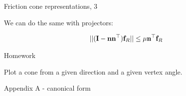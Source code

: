 \documentclass{beamer}
\begin{document}
\begin{frame}{Friction cone representations, 3}
	\begin{flushleft}
		
		We can do the same with projectors:
		
		
		\begin{equation}
			|| (\mathbf{I} - \mathbf{n}\mathbf{n}^\top) \mathbf{f}_R ||
			\leq \mu \mathbf{n}^\top \mathbf{f}_R
		\end{equation}
		
		
		
	\end{flushleft}
\end{frame}




\begin{frame}{Homework}
\begin{flushleft}

Plot a cone from a given direction and a given vertex angle.

\end{flushleft}
\end{frame}





\myqrframe



\begin{frame}
	\centerline{\huge Appendix A - canonical form}
\end{frame}
\end{document}
